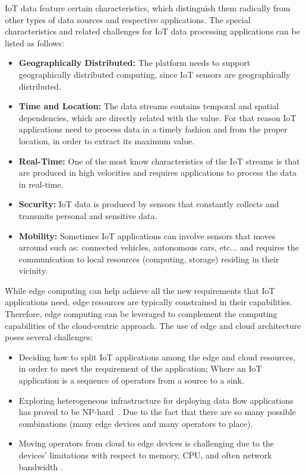 IoT data feature certain characteristics, which distinguish them radically from other types of data sources and respective applications. The special characteristics and related challenges for IoT data processing applications can be listed as follows:

\begin{itemize}

\item{\textbf{Geographically Distributed:}} The platform needs to support geographically distributed computing, since IoT sensors are geographically distributed.

\item{\textbf{Time and Location:}} The data streams contains temporal and spatial dependencies, which are directly related with the value. For that reason IoT applications need to process data in a timely fashion and from the proper location, in order to extract its maximum value.

\item{\textbf{Real-Time:}} One of the most know characteristics of the IoT streams is that are produced in high velocities and requires applications to process the data in real-time. 

\item{\textbf{Security:}} IoT data is produced by sensors that constantly collects and transmits personal and sensitive data.

\item{\textbf{Mobility:}} Sometimes IoT applications can involve sensors that moves arround such as: connected vehicles, autonomous cars, etc... and requires the communication to local resources (computing, storage) residing in their vicinity. 

\end{itemize}

While edge computing can help achieve all the new requirements that IoT applications need, edge resources are typically constrained in their capabilities. Therefore, edge computing can be leveraged to complement the computing capabilities of the cloud-centric approach. The use of edge and cloud architecture poses several challenges: 

\begin{itemize}
\item Deciding how to split IoT applications among the edge and cloud resources, in order to meet the requirement of the application; Where an IoT application is a sequence of operators from a source to a sink. 

\item Exploring heterogeneous infrastructure for deploying data flow applications has proved to be NP-hard~\cite{Benoit:2013}. Due to the fact that there are so many possible combinations (many edge devices and many operators to place). 
 
\item Moving operators from cloud to edge devices is challenging due to the devices' limitations with respect to memory, CPU, and often network bandwidth \cite{dias:2018:survey}.
\end{itemize}

